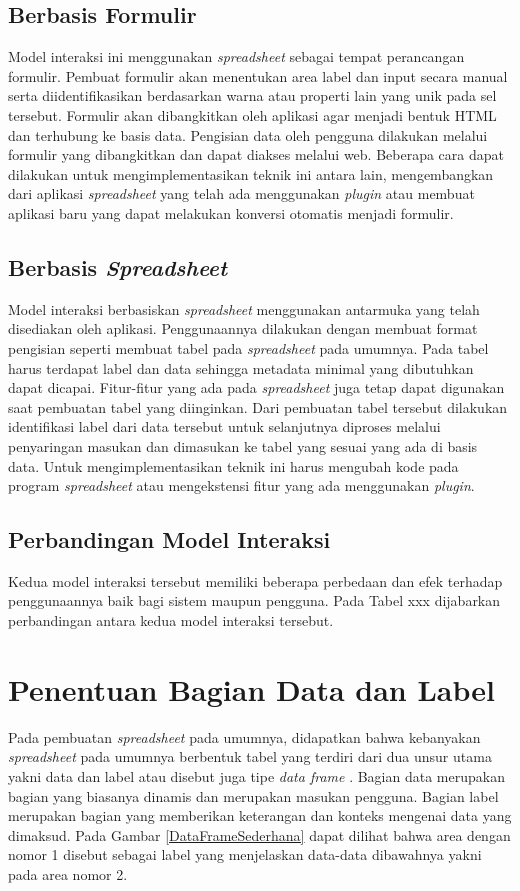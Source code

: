 	\subsection{Berbasis Formulir}
	Model interaksi ini menggunakan \textit{spreadsheet} sebagai tempat perancangan formulir. Pembuat formulir akan menentukan area label dan input secara manual serta diidentifikasikan berdasarkan warna atau properti lain yang unik pada sel tersebut. Formulir akan dibangkitkan oleh aplikasi agar menjadi bentuk HTML dan terhubung ke basis data. Pengisian data oleh pengguna dilakukan melalui formulir yang dibangkitkan dan dapat diakses melalui web. Beberapa cara dapat dilakukan untuk mengimplementasikan teknik ini antara lain, mengembangkan dari aplikasi \textit{spreadsheet} yang telah ada menggunakan \textit{plugin} atau membuat aplikasi baru yang dapat melakukan konversi otomatis menjadi formulir.

	\subsection{Berbasis \textit{Spreadsheet}}
	Model interaksi berbasiskan \textit{spreadsheet} menggunakan antarmuka yang telah disediakan oleh aplikasi. Penggunaannya dilakukan dengan membuat format pengisian seperti membuat tabel pada \textit{spreadsheet} pada umumnya. Pada tabel harus terdapat label dan data sehingga metadata minimal yang dibutuhkan dapat dicapai. Fitur-fitur yang ada pada \textit{spreadsheet} juga tetap dapat digunakan saat pembuatan tabel yang diinginkan. Dari pembuatan tabel tersebut dilakukan identifikasi label dari data tersebut untuk selanjutnya diproses melalui penyaringan masukan dan dimasukan ke tabel yang sesuai yang ada di basis data. Untuk mengimplementasikan teknik ini harus mengubah kode pada program \textit{spreadsheet} atau mengekstensi fitur yang ada menggunakan \textit{plugin}. 

	\subsection{Perbandingan Model Interaksi}
	Kedua model interaksi tersebut memiliki beberapa perbedaan dan efek terhadap penggunaannya baik bagi sistem maupun pengguna. Pada Tabel xxx dijabarkan perbandingan antara kedua model interaksi tersebut.


\section{Penentuan Bagian Data dan Label}
Pada pembuatan \textit{spreadsheet} pada umumnya, didapatkan bahwa kebanyakan \textit{spreadsheet} pada umumnya berbentuk tabel yang terdiri dari dua unsur utama yakni data dan label atau disebut juga tipe \textit{data frame} \parencite{Chen2013}. Bagian data merupakan bagian yang biasanya dinamis dan merupakan masukan pengguna. Bagian label merupakan bagian yang memberikan keterangan dan konteks mengenai data yang dimaksud. Pada Gambar \ref{DataFrameSederhana} dapat dilihat bahwa area dengan nomor 1 disebut sebagai label yang menjelaskan data-data dibawahnya yakni pada area nomor 2.

